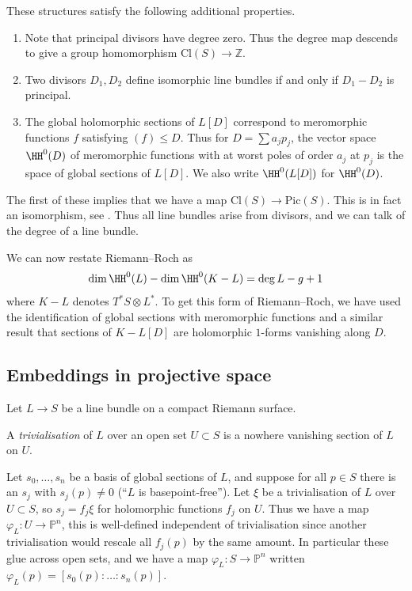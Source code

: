 These structures satisfy the following additional properties.
\begin{enumerate}
    \item Note that principal divisors have degree zero. Thus the degree map
        descends to give a group homomorphism \(\text{Cl}(S)\to \mathbb{Z}\).
    \item Two divisors \(D_1,D_2\) define isomorphic line bundles if and only if
        \(D_1-D_2\) is principal.
    \item The global holomorphic sections of \(L[D]\) correspond to meromorphic
        functions \(f\) satisfying \((f)\leq D\). Thus for \(D=\sum a_jp_j\),
        the vector space \(\HH^0(D)\) of meromorphic functions with at worst
        poles of order \(a_j\) at \(p_j\) is the space of global sections of
        \(L[D]\). We also write \(\HH^0(L[D])\) for \(\HH^0(D)\).
\end{enumerate}

The first of these implies that we have a map \(\text{Cl}(S)\to \text{Pic}(S)\).
This is in fact an isomorphism, see \cite{donaldsonRiemannSurfaces}. Thus
all line bundles arise from divisors, and we can talk of the degree of a line
bundle.


We can now restate Riemann--Roch as
\[
    \dim \HH^0(L) - \dim \HH^0(K-L) = \deg L - g + 1
\]
where \(K-L\) denotes \(T^\ast S \otimes L^\ast\). To get this form of
Riemann--Roch, we have used the identification of global sections with
meromorphic functions and a similar result that sections of \(K-L[D]\) are
holomorphic \(1\)-forms vanishing along \(D\).

\subsection{Embeddings in projective space} Let \(L\to S\) be a line bundle on a
compact Riemann surface.

\begin{definition}
    A \textit{trivialisation} of \(L\) over an open set \(U\subset S\) is a
    nowhere vanishing section of \(L\) on \(U\).
\end{definition}

Let \(s_0,\ldots,s_n\) be a basis of global sections of \(L\), and suppose for all
\(p\in S\) there is an \(s_j\) with \(s_j (p) \neq 0\) (``\(L\) is
basepoint-free''). Let \(\xi\) be a trivialisation of \(L\) over
\(U\subset S\), so \(s_j=f_j\xi\) for holomorphic functions \(f_j\) on
\(U\). Thus we have a map \(\varphi_L:U\to \mathbb{P}^n\), this is well-defined
independent of trivialisation since another trivialisation would rescale all
\(f_j(p)\) by the same amount. In particular these glue across open sets,
and we have a map \(\varphi_L: S\to \mathbb{P}^n\) written
\(\varphi_L(p)=[s_0(p):\ldots:s_n(p)]\).

